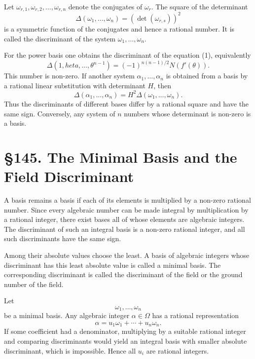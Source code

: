 \documentclass[11pt,a4paper]{book}
\newcommand{\webersection}[2]{\clearpage\section*{\S #1. #2}}
\begin{document}
Let \(\omega_{r,1},
\omega_{r,2},
\ldots,
\omega_{r,n}\) denote the conjugates of \(\omega_r\).  The square of the determinant
\begin{equation}
 \Delta(\omega_1,
\ldots,
\omega_n)=
\left(\det(\omega_{r,s})\right)^2 \tag{4}
\end{equation}
is a symmetric function of the conjugates and hence a rational number.  It is called the discriminant of the system \(\omega_1,
\ldots,
\omega_n\).

For the power basis one obtains the discriminant of the equation (1), equivalently
\begin{equation}
 \Delta(1,	heta,
\ldots,
\theta^{n-1})=(-1)^{n(n-1)/2}N(f'(\theta)). \tag{5}
\end{equation}
This number is non-zero.  If another system \(\alpha_1,
\ldots,
\alpha_n\) is obtained from a basis by a rational linear substitution with determinant \(H\), then
\begin{equation}
 \Delta(\alpha_1,
\ldots,
\alpha_n)=H^2\Delta(\omega_1,
\ldots,
\omega_n). \tag{6}
\end{equation}
Thus the discriminants of different bases differ by a rational square and have the same sign.  Conversely, any system of \(n\) numbers whose determinant is non-zero is a basis.

\webersection{145}{The Minimal Basis and the Field Discriminant}

A basis remains a basis if each of its elements is multiplied by a non-zero rational number.  Since every algebraic number can be made integral by multiplication by a rational integer, there exist bases all of whose elements are algebraic integers.  The discriminant of such an integral basis is a non-zero rational integer, and all such discriminants have the same sign.

Among their absolute values choose the least.  A basis of algebraic integers whose discriminant has this least absolute value is called a minimal basis.  The corresponding discriminant is called the discriminant of the field or the ground number of the field.

Let
\[
 \omega_1,
\ldots,
\omega_n
\]
be a minimal basis.  Any algebraic integer \(\alpha\in\Omega\) has a rational representation
\[
 \alpha=u_1\omega_1+
\cdots+u_n\omega_n.
\]
If some coefficient had a denominator, multiplying by a suitable rational integer and comparing discriminants would yield an integral basis with smaller absolute discriminant, which is impossible.  Hence all \(u_i\) are rational integers.
\end{document}
